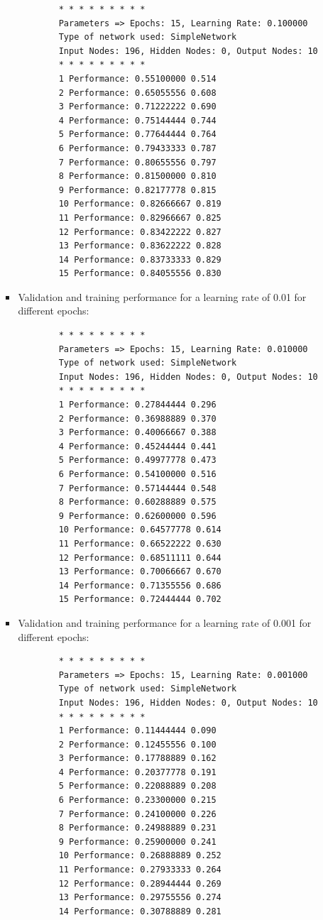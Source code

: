 \documentclass[11pt]{article}
\begin{document}
\begin{enumerate}
\begin{enumerate}
\begin{itemize}
		\begin{verbatim}
		* * * * * * * * *
		Parameters => Epochs: 15, Learning Rate: 0.100000
		Type of network used: SimpleNetwork
		Input Nodes: 196, Hidden Nodes: 0, Output Nodes: 10
		* * * * * * * * *
		1 Performance: 0.55100000 0.514
		2 Performance: 0.65055556 0.608
		3 Performance: 0.71222222 0.690
		4 Performance: 0.75144444 0.744
		5 Performance: 0.77644444 0.764
		6 Performance: 0.79433333 0.787
		7 Performance: 0.80655556 0.797
		8 Performance: 0.81500000 0.810
		9 Performance: 0.82177778 0.815
		10 Performance: 0.82666667 0.819
		11 Performance: 0.82966667 0.825
		12 Performance: 0.83422222 0.827
		13 Performance: 0.83622222 0.828
		14 Performance: 0.83733333 0.829
		15 Performance: 0.84055556 0.830
		\end{verbatim}
	\item Validation and training performance for a learning rate of 0.01 for different epochs:
		\begin{verbatim}
		* * * * * * * * *
		Parameters => Epochs: 15, Learning Rate: 0.010000
		Type of network used: SimpleNetwork
		Input Nodes: 196, Hidden Nodes: 0, Output Nodes: 10
		* * * * * * * * *
		1 Performance: 0.27844444 0.296
		2 Performance: 0.36988889 0.370
		3 Performance: 0.40066667 0.388
		4 Performance: 0.45244444 0.441
		5 Performance: 0.49977778 0.473
		6 Performance: 0.54100000 0.516
		7 Performance: 0.57144444 0.548
		8 Performance: 0.60288889 0.575
		9 Performance: 0.62600000 0.596
		10 Performance: 0.64577778 0.614
		11 Performance: 0.66522222 0.630
		12 Performance: 0.68511111 0.644
		13 Performance: 0.70066667 0.670
		14 Performance: 0.71355556 0.686
		15 Performance: 0.72444444 0.702
		\end{verbatim}
	\item Validation and training performance for a learning rate of 0.001 for different epochs:
		\begin{verbatim}
		* * * * * * * * *
		Parameters => Epochs: 15, Learning Rate: 0.001000
		Type of network used: SimpleNetwork
		Input Nodes: 196, Hidden Nodes: 0, Output Nodes: 10
		* * * * * * * * *
		1 Performance: 0.11444444 0.090
		2 Performance: 0.12455556 0.100
		3 Performance: 0.17788889 0.162
		4 Performance: 0.20377778 0.191
		5 Performance: 0.22088889 0.208
		6 Performance: 0.23300000 0.215
		7 Performance: 0.24100000 0.226
		8 Performance: 0.24988889 0.231
		9 Performance: 0.25900000 0.241
		10 Performance: 0.26888889 0.252
		11 Performance: 0.27933333 0.264
		12 Performance: 0.28944444 0.269
		13 Performance: 0.29755556 0.274
		14 Performance: 0.30788889 0.281

\end{verbatim}
\end{itemize}
\end{enumerate}
\end{enumerate}
\end{document}

